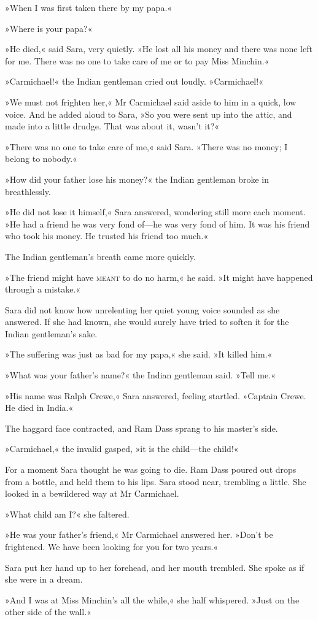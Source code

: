 »When I was first taken there by my papa.«

»Where is your papa?«

»He died,« said Sara, very quietly. »He lost all his money and there was none left for me. There was no one to take care of me or to pay Miss Minchin.«

»Carmichael!« the Indian gentleman cried out loudly. »Carmichael!«

»We must not frighten her,« Mr Carmichael said aside to him in a quick, low voice. And he added aloud to Sara, »So you were sent up into the attic, and made into a little drudge. That was about it, wasn't it?«

»There was no one to take care of me,« said Sara. »There was no money; I belong to nobody.«

»How did your father lose his money?« the Indian gentleman broke in breathlessly.

»He did not lose it himself,« Sara answered, wondering still more each moment. »He had a friend he was very fond of—he was very fond of him. It was his friend who took his money. He trusted his friend too much.«

The Indian gentleman's breath came more quickly.

»The friend might have \textsc{meant} to do no harm,« he said. »It might have happened through a mistake.«

Sara did not know how unrelenting her quiet young voice sounded as she answered. If she had known, she would surely have tried to soften it for the Indian gentleman's sake.

»The suffering was just as bad for my papa,« she said. »It killed him.«

»What was your father's name?« the Indian gentleman said. »Tell me.«

»His name was Ralph Crewe,« Sara answered, feeling startled. »Captain Crewe. He died in India.«

The haggard face contracted, and Ram Dass sprang to his master's side.

»Carmichael,« the invalid gasped, »it is the child—the child!«

For a moment Sara thought he was going to die. Ram Dass poured out drops from a bottle, and held them to his lips. Sara stood near, trembling a little. She looked in a bewildered way at Mr Carmichael.

»What child am I?« she faltered.

»He was your father's friend,« Mr Carmichael answered her. »Don't be frightened. We have been looking for you for two years.«

Sara put her hand up to her forehead, and her mouth trembled. She spoke as if she were in a dream.

»And I was at Miss Minchin's all the while,« she half whispered. »Just on the other side of the wall.«


